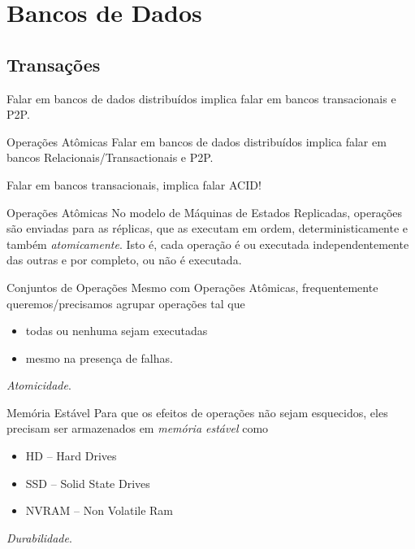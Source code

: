 \section{Bancos de Dados}

\subsection{Transações}
Falar em bancos de dados distribuídos implica falar em bancos transacionais e P2P.

\begin{frame}{Operações Atômicas}
Falar em bancos de dados distribuídos implica falar em bancos Relacionais/Transactionais e P2P.

Falar em bancos transacionais, implica falar ACID!
\end{frame}


\begin{frame}{Operações Atômicas}
No modelo de Máquinas de Estados Replicadas, operações são enviadas para as réplicas, que as executam em ordem, deterministicamente e também \emph{atomicamente}. Isto é, cada operação é ou executada independentemente das outras e por completo, ou não é executada.
\end{frame}

\begin{frame}{Conjuntos de Operações}
Mesmo com Operações Atômicas, frequentemente queremos/precisamos agrupar operações tal que
\begin{itemize}
	\item \alert{todas ou nenhuma} sejam executadas
	\item mesmo na presença de falhas.
\end{itemize}

\pause \emph{Atomicidade}.
\end{frame}




\begin{frame}{Memória Estável}
Para que os efeitos de operações não sejam esquecidos, eles precisam ser armazenados em \emph{memória estável} como
\begin{itemize}
	\item HD -- Hard Drives
	\item SSD -- Solid State Drives
	\item NVRAM -- Non Volatile Ram
\end{itemize} 

\pause \emph{Durabilidade}.
\end{frame}



